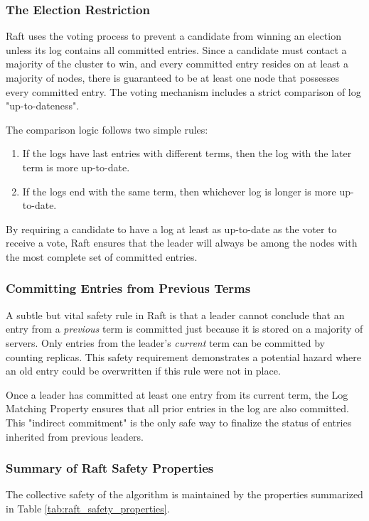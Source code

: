 \subsubsection{The Election Restriction}
Raft uses the voting process to prevent a candidate from winning an election unless its log contains all committed entries.
Since a candidate must contact a majority of the cluster to win, and every committed entry resides on at least a majority of nodes, there is guaranteed to be at least one node that possesses every committed entry.
The voting mechanism includes a strict comparison of log "up-to-dateness".

The comparison logic follows two simple rules:
\begin{enumerate}
    \item If the logs have last entries with different terms, then the log with the later term is more up-to-date.
    \item If the logs end with the same term, then whichever log is longer is more up-to-date.
\end{enumerate}
By requiring a candidate to have a log at least as up-to-date as the voter to receive a vote, Raft ensures that the leader will always be among the nodes with the most complete set of committed entries.

\subsubsection{Committing Entries from Previous Terms}
A subtle but vital safety rule in Raft is that a leader cannot conclude that an entry from a \textit{previous} term is committed just because it is stored on a majority of servers.
Only entries from the leader's \textit{current} term can be committed by counting replicas.
This safety requirement demonstrates a potential hazard where an old entry could be overwritten if this rule were not in place.

Once a leader has committed at least one entry from its current term, the Log Matching Property ensures that all prior entries in the log are also committed. This "indirect commitment" is the only safe way to finalize the status of entries inherited from previous leaders.

\subsubsection{Summary of Raft Safety Properties}
The collective safety of the algorithm is maintained by the properties summarized in Table \ref{tab:raft_safety_properties}.

